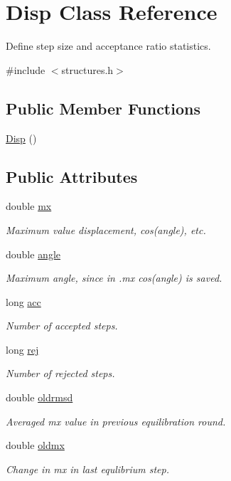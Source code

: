 \hypertarget{class_disp}{\section{Disp Class Reference}
\label{class_disp}
}


Define step size and acceptance ratio statistics.  




{\ttfamily \#include $<$structures.\+h$>$}

\subsection*{Public Member Functions}
\begin{DoxyCompactItemize}
\item 
\hyperlink{class_disp_a9e3457b8cfea7679b70bd7e724134661}{Disp} ()
\end{DoxyCompactItemize}
\subsection*{Public Attributes}
\begin{DoxyCompactItemize}
\item 
double \hyperlink{class_disp_a12da7c0801e5ce844e28b7a785b7556c}{mx}
\begin{DoxyCompactList}\small\item\em Maximum value displacement, cos(angle), etc. \end{DoxyCompactList}\item 
double \hyperlink{class_disp_a40442346e379ba0674a8401502551b3a}{angle}
\begin{DoxyCompactList}\small\item\em Maximum angle, since in .mx cos(angle) is saved. \end{DoxyCompactList}\item 
long \hyperlink{class_disp_a2f55a3f871df675bd8eedbaa706b4c03}{acc}
\begin{DoxyCompactList}\small\item\em Number of accepted steps. \end{DoxyCompactList}\item 
long \hyperlink{class_disp_adcb197b8efb6392c5d08e1222cd488ee}{rej}
\begin{DoxyCompactList}\small\item\em Number of rejected steps. \end{DoxyCompactList}\item 
double \hyperlink{class_disp_ad895f0ec10cdd0f00de4a65667566f5b}{oldrmsd}
\begin{DoxyCompactList}\small\item\em Averaged mx value in previous equilibration round. \end{DoxyCompactList}\item 
double \hyperlink{class_disp_a3aa81c561f1dac48d4c486468b960919}{oldmx}
\begin{DoxyCompactList}\small\item\em Change in mx in last equlibrium step. \end{DoxyCompactList}\end{DoxyCompactItemize}


